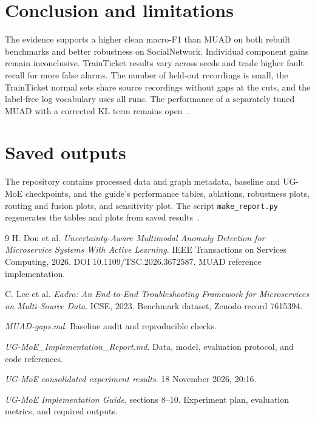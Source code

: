 \documentclass[11pt,a4paper,onecolumn]{IEEEtran}
\begin{document}
\section{Conclusion and limitations}

The evidence supports a higher clean macro-F1 than MUAD on both rebuilt benchmarks and better robustness on
SocialNetwork. Individual component gains remain inconclusive. TrainTicket results vary across seeds and
trade higher fault recall for more false alarms. The number of held-out recordings is small, the TrainTicket
normal sets share source recordings without gaps at the cuts, and the label-free log vocabulary uses all
runs. The performance of a separately tuned MUAD with a corrected KL term remains
open~\cite{muad-audit,implementation-report,experiment-results}.

\section*{Saved outputs}

The repository contains processed data and graph metadata, baseline and UG-MoE checkpoints, and the guide's
performance tables, ablations, robustness plots, routing and fusion plots, and sensitivity plot. The script
\texttt{make\_report.py} regenerates the tables and plots from saved
results~\cite{implementation-report,experiment-results,implementation-guide}.

\begin{thebibliography}{9}
H. Dou et al. \emph{Uncertainty-Aware Multimodal Anomaly Detection for Microservice Systems With Active
Learning}. IEEE Transactions on Services Computing, 2026. DOI 10.1109/TSC.2026.3672587. MUAD reference
implementation.

C. Lee et al. \emph{Eadro: An End-to-End Troubleshooting Framework for Microservices on Multi-Source Data}.
ICSE, 2023. Benchmark dataset, Zenodo record 7615394.

\emph{MUAD-gaps.md}. Baseline audit and reproducible checks.

\emph{UG-MoE\_Implementation\_Report.md}. Data, model, evaluation protocol, and code references.

\emph{UG-MoE consolidated experiment results}. 18 November 2026, 20:16.

\emph{UG-MoE Implementation Guide}, sections 8--10. Experiment plan, evaluation metrics, and required
outputs.

\end{thebibliography}
\end{document}
